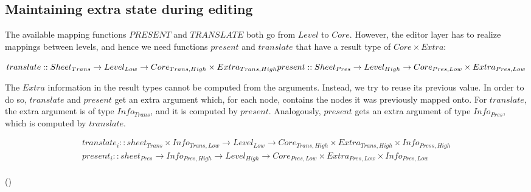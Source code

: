%										
%										
\subsection{Maintaining extra state during editing} \label{sect:maintainingExtraState}


The available mapping functions $PRESENT$ and $TRANSLATE$ both go from $Level$ to $Core$. However, the editor layer has to realize mappings between levels, and hence we need functions $present$ and $translate$ that have a result type of $Core \times Extra$:

\begin{math}
translate :: Sheet_{Trans} \rightarrow Level_{Low} \rightarrow Core_{Trans,High}  \times Extra_{Trans,High} \\
present :: Sheet_{Pres} \rightarrow Level_{High} \rightarrow Core_{Pres,Low} \times Extra_{Pres,Low} \\
\end{math}

The $Extra$ information in the result types cannot be computed from the arguments. Instead, we try to reuse its previous value. In order to do so, $translate$ and $present$ get an extra argument which, for each node, contains the nodes it was previously mapped onto. For $translate$, the extra argument is of type $Info_{Trans}$, and it is computed by $present$. Analogously, $present$ gets an extra argument of type $Info_{Pres}$, which is computed by $translate$. 

\begin{small}\begin{align*}
translate_{i} :: sheet_{Trans} \times Info_{Trans,Low} \rightarrow Level_{Low} \rightarrow Core_{Trans,High}  \times Extra_{Trans,High}  \times Info_{Press,High}\\
present_{i} :: sheet_{Pres}  \rightarrow Info_{Pres,High} \rightarrow  Level_{High} \rightarrow Core_{Pres,Low} \times Extra_{Pres,Low}   \times Info_{Pres,Low} \\
\end{align*} 
\end{small}
{\centering ()\\}


